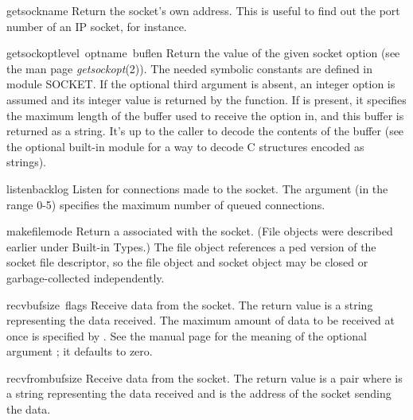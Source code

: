 \begin{funcdesc}{getsockname}{}
Return the socket's own address.  This is useful to find out the port
number of an IP socket, for instance.
\end{funcdesc}

\begin{funcdesc}{getsockopt}{level\, optname\, buflen}
Return the value of the given socket option (see the \UNIX{} man page
{\it getsockopt}(2)).  The needed symbolic constants are defined in module
SOCKET.  If the optional third argument is absent, an integer option
is assumed and its integer value is returned by the function.  If
 is present, it specifies the maximum length of the buffer used
to receive the option in, and this buffer is returned as a string.
It's up to the caller to decode the contents of the buffer (see the
optional built-in module  for a way to decode C structures
encoded as strings).
\end{funcdesc}

\begin{funcdesc}{listen}{backlog}
Listen for connections made to the socket.
The argument (in the range 0-5) specifies the maximum number of
queued connections.
\end{funcdesc}

\begin{funcdesc}{makefile}{mode}
Return a  associated with the socket.
(File objects were described earlier under Built-in Types.)
The file object references a ped version of the socket file
descriptor, so the file object and socket object may be closed or
garbage-collected independently.
\end{funcdesc}

\begin{funcdesc}{recv}{bufsize\, flags}
Receive data from the socket.  The return value is a string representing
the data received.  The maximum amount of data to be received
at once is specified by .  See the \UNIX{} manual page
for the meaning of the optional argument ; it defaults to
zero.
\end{funcdesc}

\begin{funcdesc}{recvfrom}{bufsize}
Receive data from the socket.  The return value is a pair
 where  is a string
representing the data received and  is the address of the
socket sending the data.
\end{funcdesc}

